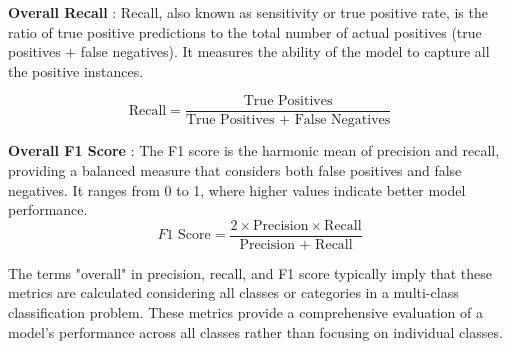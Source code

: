 \textbf{Overall Recall} :
   Recall, also known as sensitivity or true positive rate, is the ratio of true positive predictions to the total number of actual positives (true positives + false negatives). It measures the ability of the model to capture all the positive instances.
   
   \begin{equation}
        \text{Recall} = \frac{\text{True Positives}}{\text{True Positives + False Negatives}} 
   \end{equation}
  

\textbf{Overall F1 Score} :
   The F1 score is the harmonic mean of precision and recall, providing a balanced measure that considers both false positives and false negatives. It ranges from 0 to 1, where higher values indicate better model performance.
   \begin{equation}
        F1 \text{ Score} = \frac{2 \times \text{Precision} \times \text{Recall}}{\text{Precision + Recall}} 
   \end{equation}
  

The terms "overall" in precision, recall, and F1 score typically imply that these metrics are calculated considering all classes or categories in a multi-class classification problem. These metrics provide a comprehensive evaluation of a model's performance across all classes rather than focusing on individual classes.

